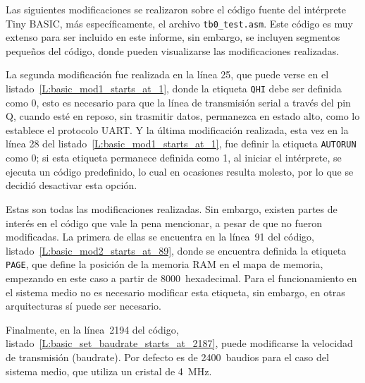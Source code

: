 Las siguientes modificaciones se realizaron sobre el código fuente del intérprete Tiny BASIC, más específicamente, el archivo \texttt{tb0\_test.asm}. Este código es muy extenso para ser incluido en este informe, sin embargo, se incluyen segmentos pequeños del código, donde pueden visualizarse las modificaciones realizadas.

La segunda modificación fue realizada en la línea 25, que puede verse en el listado~\ref{L:basic_mod1_starts_at_1}, donde la etiqueta \texttt{QHI} debe ser definida como 0, esto es necesario para que la línea de transmisión serial a través del pin Q, cuando esté en reposo, sin trasmitir datos, permanezca en estado alto, como lo establece el protocolo UART. Y la última modificación realizada, esta vez en la línea 28 del listado~\ref{L:basic_mod1_starts_at_1}, fue definir la etiqueta \texttt{AUTORUN} como 0; si esta etiqueta permanece definida como 1, al iniciar el intérprete, se ejecuta un código predefinido, lo cual en ocasiones resulta molesto, por lo que se decidió desactivar esta opción.

\footnotesize

\normalsize

Estas son todas las modificaciones realizadas. Sin embargo, existen partes de interés en el código que vale la pena mencionar, a pesar de que no fueron modificadas. La primera de ellas se encuentra en la línea~91 del código, listado~\ref{L:basic_mod2_starts_at_89}, donde se encuentra definida la etiqueta \texttt{PAGE}, que define la posición de la memoria RAM en el mapa de memoria, empezando en este caso a partir de 8000~hexadecimal. Para el funcionamiento en el sistema medio no es necesario modificar esta etiqueta, sin embargo, en otras arquitecturas sí puede ser necesario.

\clearpage
\footnotesize

\normalsize

Finalmente, en la línea~2194 del código, listado~\ref{L:basic_set_baudrate_starts_at_2187}, puede modificarse la velocidad de transmisión (baudrate). Por defecto es de \num{2400}~baudios para el caso del sistema medio, que utiliza un cristal de \num{4}~\si{\mega\hertz}.

